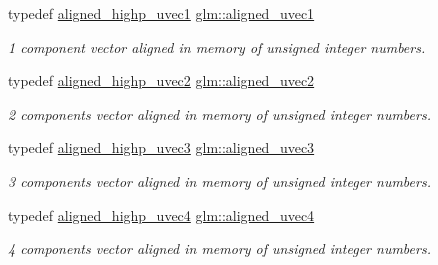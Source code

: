\begin{DoxyCompactItemize}
typedef \hyperlink{group__gtc__type__aligned_ga3ba8c6f6b81f57159b0536ce5d4339d0}{aligned\+\_\+highp\+\_\+uvec1} \hyperlink{group__gtc__type__aligned_gab0fbe9830a7129d9135b558b30eed930}{glm\+::aligned\+\_\+uvec1}
\begin{DoxyCompactList}\small\item\em 1 component vector aligned in memory of unsigned integer numbers. \end{DoxyCompactList}\item 
\mbox{\label{group__gtc__type__aligned_gacddd39189c2dedf7dd48c02155279124}} 
typedef \hyperlink{group__gtc__type__aligned_ga4497b2f3be81910c7a1bf632b51ac9a6}{aligned\+\_\+highp\+\_\+uvec2} \hyperlink{group__gtc__type__aligned_gacddd39189c2dedf7dd48c02155279124}{glm\+::aligned\+\_\+uvec2}
\begin{DoxyCompactList}\small\item\em 2 components vector aligned in memory of unsigned integer numbers. \end{DoxyCompactList}\item 
\mbox{\label{group__gtc__type__aligned_ga5dee635ca69be0f5de5630a59d89034f}} 
typedef \hyperlink{group__gtc__type__aligned_ga1d303644825af6267389d6405f490ddc}{aligned\+\_\+highp\+\_\+uvec3} \hyperlink{group__gtc__type__aligned_ga5dee635ca69be0f5de5630a59d89034f}{glm\+::aligned\+\_\+uvec3}
\begin{DoxyCompactList}\small\item\em 3 components vector aligned in memory of unsigned integer numbers. \end{DoxyCompactList}\item 
\mbox{\label{group__gtc__type__aligned_ga1e0792f3c64836e042ee3aad9bd8209c}} 
typedef \hyperlink{group__gtc__type__aligned_ga85553b476297f73c07bf3228ffb02d81}{aligned\+\_\+highp\+\_\+uvec4} \hyperlink{group__gtc__type__aligned_ga1e0792f3c64836e042ee3aad9bd8209c}{glm\+::aligned\+\_\+uvec4}
\begin{DoxyCompactList}\small\item\em 4 components vector aligned in memory of unsigned integer numbers. \end{DoxyCompactList}\item 
\mbox{\label{group__gtc__type__aligned_gab4eb372e84e817a0d29128128394df01}} 

\end{DoxyCompactItemize}
